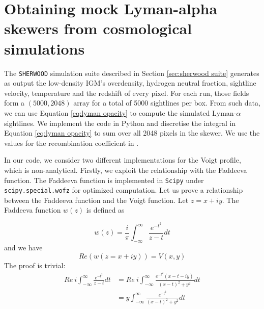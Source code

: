 \section{Obtaining mock Lyman-alpha skewers from cosmological simulations}
The \texttt{SHERWOOD} simulation suite described in Section \ref{sec:sherwood suite} generates as output the low-density IGM's overdensity, hydrogen neutral fraction, sightline velocity, temperature and the redshift of every pixel. For each run, those fields form a $(5000, 2048)$ array for a total of 5000 sightlines per box. From such data, we can use Equation \ref{eq:lyman opacity} to compute the simulated Lyman-$\alpha$ sightlines. We implement the code in Python and discretise the integral in Equation \ref{eq:lyman opacity} to sum over all 2048 pixels in the skewer. We use the values for the recombination coefficient in \cite{Luki__2014}.

In our code, we consider two different implementations for the Voigt profile, which is non-analytical. Firstly, we exploit the relationship with the Faddeeva function. The Faddeeva function is implemented in \texttt{Scipy} under \texttt{scipy.special.wofz} for optimized computation. Let us prove a relationship between the Faddeeva function and the Voigt function. Let $z=x+iy$.
The Faddeeva function $w(z)$ is defined as

\begin{equation}
    w(z)=\frac{i}{\pi} \int_{-\infty}^{\infty} \frac{e^{-t^2}}{z-t}dt
\end{equation}
and we have 
\begin{equation}\label{eq:FAD}
    Re \left( w(z=x+iy) \right)=V(x,y)
\end{equation}
The proof is trivial:
\begin{equation}
    \begin{split}
        Re\ i \int_{-\infty}^{\infty} \frac{e^{-t^2}}{z-t}dt
        &= Re\ i \int_{-\infty}^{\infty} \frac{e^{-t^2} (x-t-iy)}{(x-t)^2+y^2}dt\\
        &=y\int_{-\infty}^{\infty} \frac{e^{-t^2}}{(x-t)^2+y^2}dt
    \end{split}
\end{equation}

